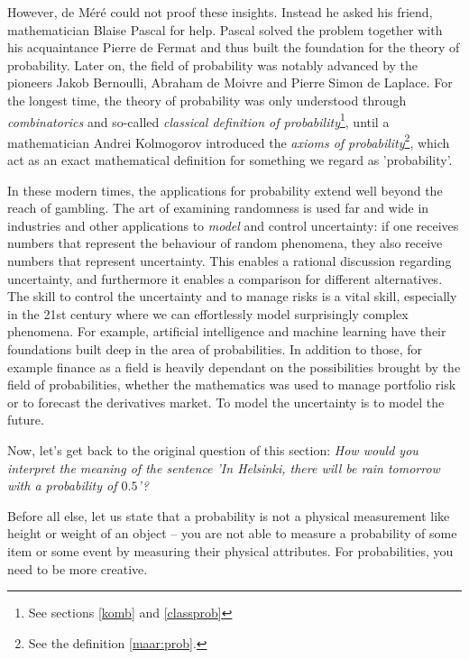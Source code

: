 \documentclass[12pt,a4paper,leqno]{report}
\theoremstyle{plain}
\theoremstyle{definition}
\begin{document}
However, de Méré could not proof these insights. Instead he asked his friend, mathematician Blaise Pascal for help. Pascal solved the problem together with his acquaintance Pierre de Fermat and thus built the foundation for the theory of probability. Later on, the field of probability was notably advanced by the pioneers Jakob Bernoulli, Abraham de Moivre and Pierre Simon de Laplace. For the longest time, the theory of probability was only understood through \emph{combinatorics} and so-called \emph{classical definition of probability}\footnote{See sections \ref{komb} and \ref{classprob}}, until a mathematician Andrei Kolmogorov introduced the \emph{axioms of probability}\footnote{See the definition \ref{maar:prob}.}, which act as an exact mathematical definition for something we regard as 'probability'.

In these modern times, the applications for probability extend well beyond the reach of gambling. The art of examining randomness is used far and wide in industries and other applications to \emph{model} and control uncertainty: if one receives numbers that represent the behaviour of random phenomena, they also receive numbers that represent uncertainty. This enables a rational discussion regarding uncertainty, and furthermore it enables a comparison for different alternatives. The skill to control the uncertainty and to manage risks is a vital skill, especially in the 21st century where we can effortlessly model surprisingly complex phenomena. For example, artificial intelligence and machine learning have their foundations built deep in the area of probabilities. In addition to those, for example finance as a field is heavily dependant on the possibilities brought by the field of probabilities, whether the mathematics was used to manage portfolio risk or to forecast the derivatives market. To model the uncertainty is to model the future.

Now, let's get back to the original question of this section: \emph{How would you interpret the meaning of the sentence 'In Helsinki, there will be rain tomorrow with a probability of $0.5$'?}

Before all else, let us state that a probability is not a physical measurement like height or weight of an object -- you are not able to measure a probability of some item or some event by measuring their physical attributes. For probabilities, you need to be more creative.
\end{document}
